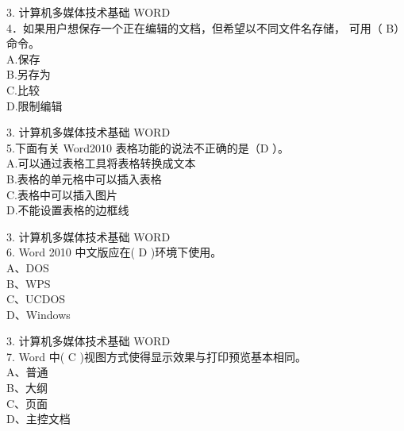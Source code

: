 \documentclass[aspectratio=169]{beamer}
\begin{document}
\begin{frame}[t]{3. 计算机多媒体技术基础} \vspace{20pt}
    WORD\\

4．如果用户想保存一个正在编辑的文档，但希望以不同文件名存储，
可用（ B）命令。\\
A.保存\\ B.另存为\\ C.比较\\ D.限制编辑\\
\end{frame}

\begin{frame}[t]{3. 计算机多媒体技术基础} \vspace{20pt}
    WORD\\


5.下面有关 Word2010 表格功能的说法不正确的是（D ）。\\
A.可以通过表格工具将表格转换成文本\\
B.表格的单元格中可以插入表格\\
C.表格中可以插入图片\\
D.不能设置表格的边框线\\
\end{frame}


\begin{frame}[t]{3. 计算机多媒体技术基础} \vspace{20pt}
    WORD\\


6. Word 2010 中文版应在( D )环境下使用。\\
A、DOS\\
    B、WPS\\
    C、UCDOS \\
    D、Windows\\

\end{frame}




\begin{frame}[t]{3. 计算机多媒体技术基础} \vspace{20pt}
    WORD\\

7. Word 中( C )视图方式使得显示效果与打印预览基本相同。\\
A、普通\\ B、大纲\\ C、页面\\ D、主控文档\\
\end{frame}
\end{document}
